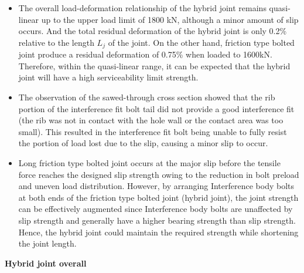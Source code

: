 \begin{itemize}

\item The overall load-deformation relationship of the hybrid joint remains quasi-linear up to the upper load limit of 1800 kN, although a minor amount of slip occurs. And the total residual deformation of the hybrid joint is only 0.2\% relative to the length $L_j$ of the joint. On the other hand, friction type bolted joint produce a residual deformation of 0.75\% when loaded to 1600kN. Therefore, within the quasi-linear range, it can be expected that the hybrid joint will have a high serviceability limit strength.

\item The observation of the sawed-through cross section showed that the rib portion of the interference fit bolt tail did not provide a good interference fit (the rib was not in contact with the hole wall or the contact area was too small). This resulted in the interference fit bolt being unable to fully resist the portion of load lost due to the slip, causing a minor slip to occur. 

\item Long friction type bolted joint occurs at the major slip before the tensile force reaches the designed slip strength owing to the reduction in bolt preload and uneven load distribution. However, by arranging Interference body bolts at both ends of the friction type bolted joint (hybrid joint), the joint strength can be effectively augmented since Interference body bolts are unaffected by slip strength and generally have a higher bearing strength than slip strength. Hence, the hybrid joint could maintain the required strength while shortening the joint length.

\end{itemize}

\textbf{Hybrid joint overall}

